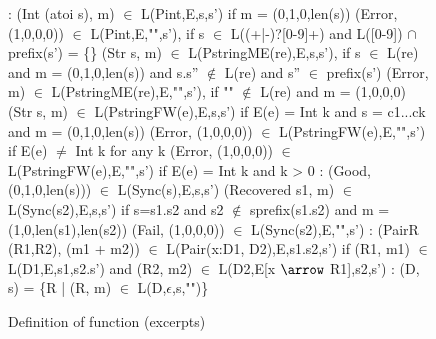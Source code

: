 \begin{figure}[t]
{\small
\begin{code}
\cdmath\small
{}:
(Int (atoi s), m) $\in$ L(Pint,E,s,s')
  if m = (0,1,0,len(s))
(Error, (1,0,0,0)) $\in$ L(Pint,E,"",s'), 
  if s $\in$ L((+|-)?[0-9]+) 
  and L([0-9]) $\cap$ prefix(s') = \{\}
(Str s, m) $\in$ L(PstringME(re),E,s,s'),
  if s $\in$ L(re) 
  and m = (0,1,0,len(s)) 
  and s.s'' $\not\in$ L(re) and s'' $\in$ prefix(s') 
(Error, m) $\in$ L(PstringME(re),E,"",s'), 
  if "" $\not\in$ L(re) and m = (1,0,0,0)
(Str s, m) $\in$ L(PstringFW(e),E,s,s') 
  if E(e) = Int k and s = c1...ck
  and m = (0,1,0,len(s))
(Error, (1,0,0,0)) $\in$ L(PstringFW(e),E,"",s') 
  if E(e) $\ne$ Int k for any k
(Error, (1,0,0,0)) $\in$ L(PstringFW(e),E,"",s') 
  if E(e) = Int k and k > 0
\mbox{}
:
(Good, (0,1,0,len(s))) $\in$ L(Sync(s),E,s,s')
(Recovered s1, m) $\in$ L(Sync(s2),E,s,s')
  if s=s1.s2 and s2 $\not\in$ sprefix(s1.s2)
  and m = (1,0,len(s1),len(s2))
(Fail, (1,0,0,0)) $\in$ L(Sync(s2),E,"",s')
\mbox{}
:
(PairR (R1,R2), (m1 + m2)) 
        $\in$ L(Pair(x:D1, D2),E,s1.s2,s')
  if  (R1, m1) $\in$ L(D1,E,s1,s2.s')
  and (R2, m2) $\in$ L(D2,E[x $\arrow$ R1],s2,s')
\mbox{}
:
(D, s) = \{R | (R, m) $\in$ L(D,$\epsilon$,s,"")\} 
\end{code}
}
\caption{Definition of  function (excerpts)}
\label{fig:parse-sem}
\end{figure}






